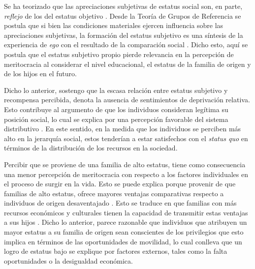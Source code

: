 \documentclass[12pt]{article}
\begin{document}
Se ha teorizado que las apreciaciones subjetivas de estatus social son, en parte, \emph{reflejo} de los del estatus objetivo \citep{Castillo2013,Schneider2015}. Desde la Teoría de Grupos de Referencia \citep{Evans1992,Evans2004,Evans2017} se postula que si bien las condiciones materiales ejercen influencia sobre las apreciaciones subjetivas, la formación del estatus subjetivo es una síntesis de la experiencia de \textit{ego} con el resultado de la comparación social \citep{festinger1954theory}. Dicho esto, aquí se postula que el estatus subjetivo propio pierde relevancia en la percepción de meritocracia al considerar el nivel educacional, el estatus de la familia de origen y de los hijos en el futuro.      

Dicho lo anterior, sostengo que la escasa relación entre estatus subjetivo y recompensa percibida, denota la ausencia de sentimientos de deprivación relativa. Esto contribuye al argumento de que los individuos consideran legítima su posición social, lo cual se explica por una percepción favorable del sistema distributivo \citep{McCoy2007,Trump2017,Day2017}. En este sentido, en la medida que los individuos se perciben más alto en la jerarquía social, estos tenderían a estar satisfechos con el \textit{status quo} en términos de la distribución de los recursos en la sociedad. 




Percibir que se proviene de una familia de alto estatus, tiene como consecuencia una menor percepción de meritocracia con respecto a los factores individuales en el proceso de surgir en la vida. Esto se puede explica porque provenir de que familias de alto estatus, ofrece mayores ventajas comparativas respecto a individuos de origen desaventajado \citep{Goldthorpe2003, Layte2017}. Esto se traduce en que familias con más recursos económicos y culturales tienen la capacidad de transmitir estas ventajas a sus hijos \citep{Bourdieu2009,Brand2010,Mare2011,Jennings2015}. Dicho lo anterior, parece razonable que individuos que atribuyen un mayor estatus a su familia de origen sean conscientes de los privilegios que esto implica en términos de las oportunidades de movilidad, lo cual conlleva que un logro de estatus bajo se explique por factores externos, tales como la falta oportunidades o la desigualdad económica. 
\end{document}
